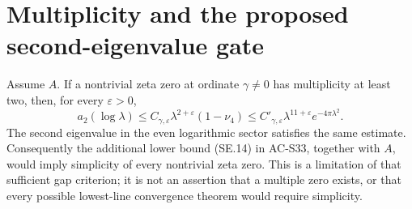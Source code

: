 \section{Multiplicity and the proposed second-eigenvalue gate}
\label{sec:spectral-multiplicity-gate}

\begin{proposition}
\label{AC-S34}
Assume $A$.  If a nontrivial zeta zero at ordinate
$\gamma\ne0$ has multiplicity at least two, then,
for every $\varepsilon>0$,
\[
 a_2(\log\lambda)\leq
        C_{\gamma,\varepsilon}\lambda^{2+\varepsilon}(1-\nu_4)
 \leq C'_{\gamma,\varepsilon}
                \lambda^{11+\varepsilon}e^{-4\pi\lambda^2}.
                                                        \tag{SM.1}
\]
The second eigenvalue in the even logarithmic sector
satisfies the same estimate.  Consequently the additional
lower bound (SE.14) in AC-S33, together with $A$, would
imply simplicity of every nontrivial zeta zero.
This is a limitation of that sufficient gap criterion;
it is not an assertion that a multiple zero exists,
or that every possible lowest-line convergence theorem
would require simplicity.
\end{proposition}
